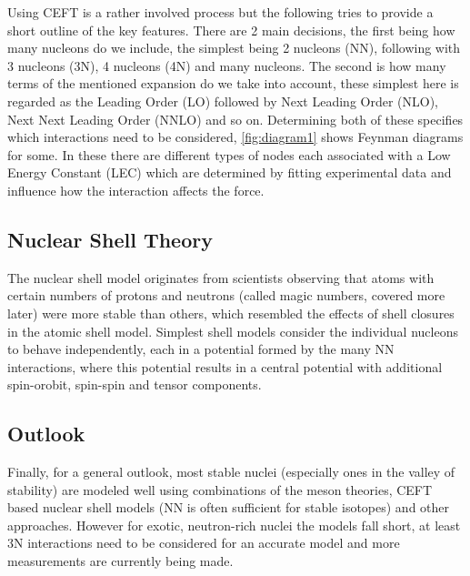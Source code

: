 Using CEFT is a rather involved process but the following tries to provide a short outline of the key features.
There are 2 main decisions, the first being how many nucleons do we include, the simplest being 2 nucleons (NN), following with 3 nucleons (3N), 4 nucleons (4N) and many nucleons.
The second is how many terms of the mentioned expansion do we take into account, these simplest here is regarded as the Leading Order (LO) followed by Next Leading Order (NLO), Next Next Leading Order (NNLO) and so on.
Determining both of these specifies which interactions need to be considered, \cref{fig:diagram1} shows Feynman diagrams for some.
In these there are different types of nodes each associated with a Low Energy Constant (LEC) which are determined by fitting experimental data and influence how the interaction affects the force. %

\subsection{Nuclear Shell Theory}
The nuclear shell model originates from scientists observing that atoms with certain numbers of protons and neutrons (called magic numbers, covered more later) were more stable than others, which resembled the effects of shell closures in the atomic shell model.
Simplest shell models consider the individual nucleons to behave independently, each in a potential formed by the many NN interactions, where this potential results in a central potential with additional spin-orobit, spin-spin and tensor components.


\subsection{Outlook}
Finally, for a general outlook, most stable nuclei (especially ones in the valley of stability) are modeled well using combinations of the meson theories, CEFT based nuclear shell models (NN is often sufficient for stable isotopes) and other approaches.
However for exotic, neutron-rich nuclei the models fall short, at least 3N interactions need to be considered for an accurate model and more measurements are currently being made.

